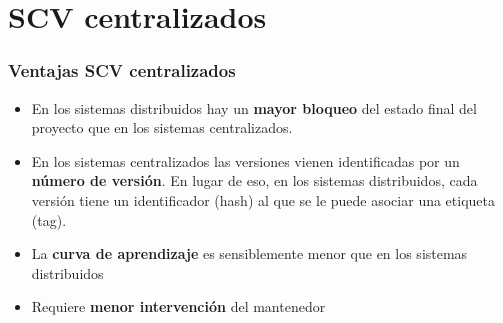 \section*{SCV centralizados}
\frame
{
\frametitle{Ventajas SCV centralizados}
\begin{itemize}
\item En los sistemas distribuidos hay un \textbf{mayor bloqueo} del estado final del proyecto que en los sistemas centralizados.
\item En los sistemas centralizados las versiones vienen identificadas por un \textbf{número de versión}. En lugar de eso, en los sistemas distribuidos, cada versión tiene un identificador (hash) al que se le puede asociar una etiqueta (tag).
\item La \textbf{curva de aprendizaje} es sensiblemente menor que en los sistemas distribuidos
\item Requiere \textbf{menor intervención} del mantenedor
\end{itemize}
}
